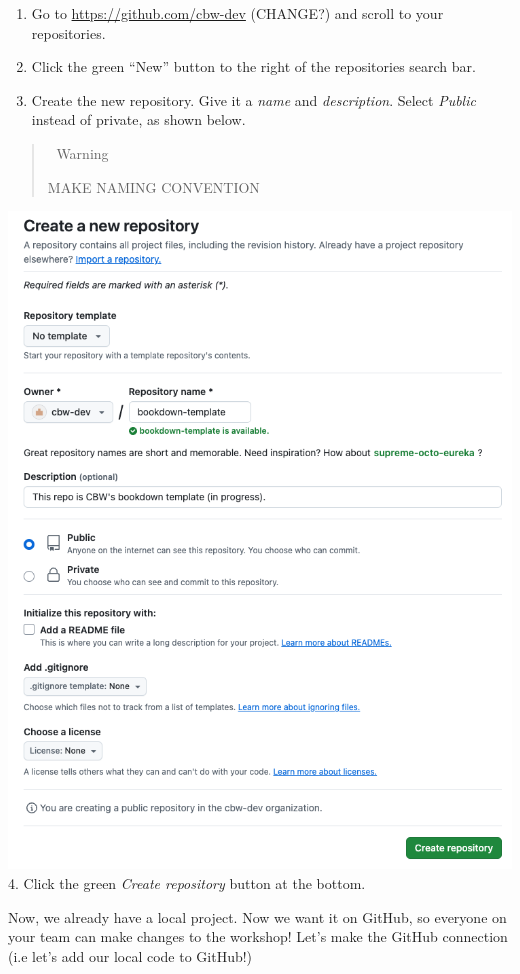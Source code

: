 \documentclass[
]{book}
\theoremstyle{definition}
\theoremstyle{definition}
\theoremstyle{definition}
\theoremstyle{definition}
\theoremstyle{remark}
\begin{document}
\begin{enumerate}
\def\labelenumi{\arabic{enumi}.}
\item
  Go to \url{https://github.com/cbw-dev} (CHANGE?) and scroll to your repositories.
\item
  Click the green ``New'' button to the right of the repositories search bar.
\item
  Create the new repository. Give it a \emph{name} and \emph{description}. Select \emph{Public} instead of private, as shown below.
\end{enumerate}

\begin{quote}
🚧 Warning

MAKE NAMING CONVENTION
\end{quote}

\includegraphics{img/git-instruct/create-git-repo.png}
4. Click the green \emph{Create repository} button at the bottom.

Now, we already have a local project. Now we want it on GitHub, so everyone on your team can make changes to the workshop! Let's make the GitHub connection (i.e let's add our local code to GitHub!)
\end{document}
